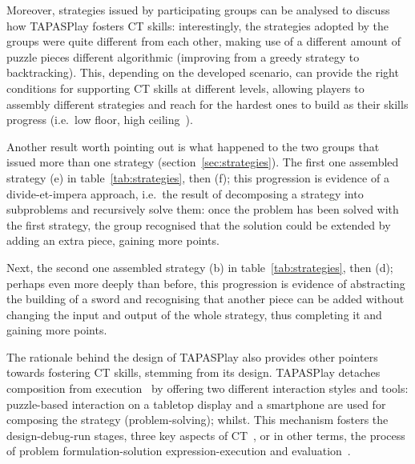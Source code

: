 Moreover, strategies issued by participating groups can be analysed to discuss how TAPASPlay fosters \ac{CT} skills: interestingly, the strategies adopted by the groups were quite different from each other, making use of a different amount of puzzle pieces  different algorithmic  (improving from a greedy strategy to backtracking). This, depending on the developed scenario, can provide the right conditions for supporting \ac{CT} skills at different levels, allowing players to assembly different strategies and reach for the hardest ones to build as their skills progress (i.e.\ low floor, high ceiling~\cite{Repenning:fy}).

Another result worth pointing out is what happened to the two groups that issued more than one strategy (section~\ref{sec:strategies}). The first one assembled strategy (e) in table~\ref{tab:strategies}, then (f); this progression is evidence of a divide-et-impera approach, i.e.\ the result of decomposing a strategy into subproblems and recursively solve them: once the problem has been solved with the first strategy, the group recognised that the solution could be extended by adding an extra piece, gaining more points.

Next, the second one assembled strategy (b) in table~\ref{tab:strategies}, then (d); perhaps even more deeply than before, this progression is evidence of abstracting the building of a sword and recognising that another piece can be added without changing the input and output of the whole strategy, thus completing it and gaining more points.

The rationale behind the design of TAPASPlay also provides other pointers towards fostering \ac{CT} skills, stemming from its design. TAPASPlay detaches composition from execution~\cite{turchi2017tapas} by offering two different interaction styles and tools: puzzle-based interaction on a tabletop display and a smartphone are used for composing the strategy (problem-solving); whilst. This mechanism fosters the design-debug-run stages, three key aspects of \ac{CT}~\cite{Kazimoglu:2012ft}, or in other terms, the process of problem formulation-solution expression-execution and evaluation~\cite{Repenning:fy}.


